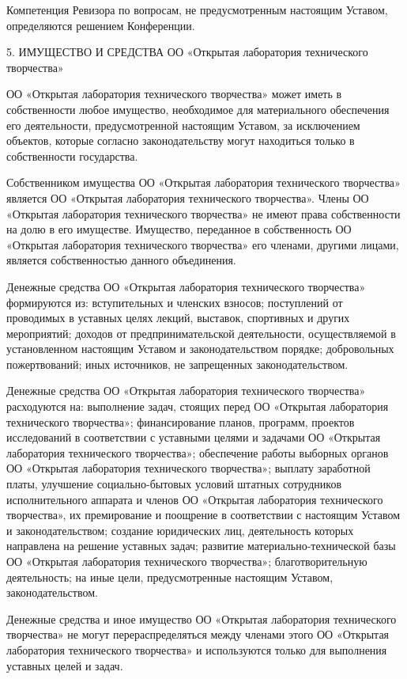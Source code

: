 \documentclass[a4paper,14pt,titlepage]{extarticle}
\begin{document}
Компетенция Ревизора по вопросам, не предусмотренным настоящим Уставом, определяются решением Конференции.

5. ИМУЩЕСТВО И СРЕДСТВА ОО «Открытая лаборатория технического творчества»

ОО «Открытая лаборатория технического творчества» может иметь в собственности любое имущество, необходимое для
материального обеспечения его деятельности, предусмотренной настоящим Уставом, за исключением объектов, которые согласно
законодательству могут находиться только в собственности государства.

Собственником имущества ОО «Открытая лаборатория технического творчества» является ОО «Открытая лаборатория технического
творчества». Члены ОО «Открытая лаборатория технического творчества» не имеют права собственности на долю в его
имуществе. Имущество, переданное в собственность ОО «Открытая лаборатория технического творчества» его членами, другими
лицами, является собственностью данного объединения.

Денежные средства ОО «Открытая лаборатория технического творчества» формируются из:
вступительных и членских взносов;
поступлений от проводимых в уставных целях лекций, выставок, спортивных и других мероприятий;
доходов от предпринимательской деятельности, осуществляемой в установленном настоящим Уставом и законодательством
порядке;
добровольных пожертвований;
иных источников, не запрещенных законодательством.

Денежные средства ОО «Открытая лаборатория технического творчества» расходуются на:
выполнение задач, стоящих перед ОО «Открытая лаборатория технического творчества»;
финансирование планов, программ, проектов исследований в соответствии с уставными целями и задачами ОО «Открытая
лаборатория технического творчества»;
обеспечение работы выборных органов ОО «Открытая лаборатория технического творчества»;
выплату заработной платы, улучшение социально-бытовых условий штатных сотрудников исполнительного аппарата и членов ОО
«Открытая лаборатория технического творчества», их премирование и поощрение в соответствии с настоящим Уставом и
законодательством;
создание юридических лиц, деятельность которых направлена на решение уставных задач;
развитие материально-технической базы ОО «Открытая лаборатория технического творчества»;
благотворительную деятельность;
на иные цели, предусмотренные настоящим Уставом, законодательством.

Денежные средства и иное имущество ОО «Открытая лаборатория технического творчества» не могут перераспределяться между
членами этого ОО «Открытая лаборатория технического творчества» и используются только для выполнения уставных целей и
задач.
\end{document}
